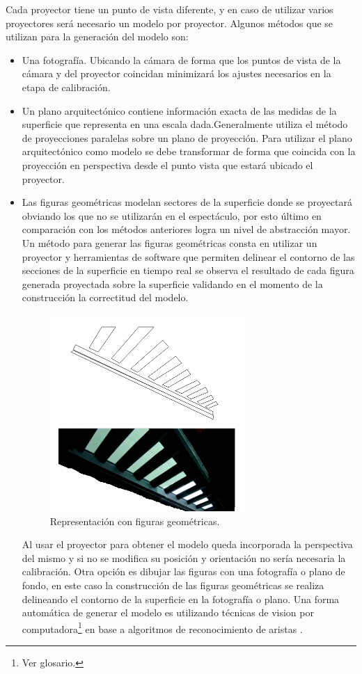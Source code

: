 Cada proyector tiene un punto de vista diferente, y en caso de utilizar varios proyectores será necesario un modelo por proyector.
Algunos métodos que se utilizan para la generación del modelo son:
\begin{itemize}
  \item Una fotografía. Ubicando la cámara de forma que los puntos de vista de la cámara y del proyector coincidan minimizará los ajustes necesarios en la etapa de calibración.
  \item Un plano arquitectónico contiene información exacta de las medidas de la superficie que representa en una escala dada.Generalmente utiliza el método de proyecciones paralelas \cite{LibroCompGrafica} sobre un plano de proyección. Para utilizar el plano arquitectónico como modelo se debe transformar de forma que coincida con la proyección en perspectiva desde el punto vista que estará ubicado el proyector.
  \item Las figuras geométricas modelan sectores de la superficie donde se proyectará obviando los que no se utilizarán en el espectáculo, por esto último en comparación con los métodos anteriores logra un nivel de abstracción mayor.
Un método para generar las figuras geométricas consta en utilizar un proyector y herramientas de software que permiten delinear el contorno de las secciones de la superficie en tiempo real se observa el resultado de cada figura generada proyectada sobre la superficie validando en el momento de la construcción la correctitud del modelo. 
\begin{figure}[H]
  \centering
    \includegraphics[width=0.7\textwidth]{./Cap2_videomapping/RepresentacionconfigurasGeometricas}
  \caption{Representación con figuras geométricas.}
  \label{fig:RepresentacionconfigurasGeometricas}
\end{figure}
Al usar el proyector para obtener el modelo queda incorporada la perspectiva del mismo y si no se modifica su posición y orientación no sería necesaria la calibración.
Otra opción es dibujar las figuras con una fotografía o plano de fondo, en este caso la construcción de las figuras geométricas se realiza delineando el contorno de la superficie en la fotografía o plano.
Una forma automática de generar el modelo es utilizando técnicas de vision por computadora\footnote{Ver glosario.} en base a algoritmos de reconocimiento de aristas \cite{ArticuloAutom2dmodel}.
\end{itemize}

